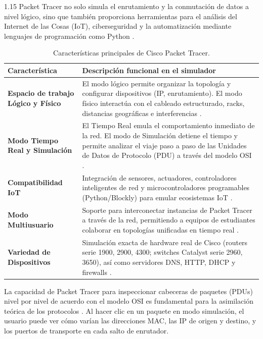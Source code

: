 \documentclass[11pt, a4paper]{article}
\begin{document}
\begin{spacing}{1.15}
Packet Tracer no solo simula el enrutamiento y la conmutación de datos a nivel lógico, sino que también proporciona herramientas para el análisis del Internet de las Cosas (IoT), ciberseguridad y la automatización mediante lenguajes de programación como Python \cite{pt_docs}.

\begin{table}[H]
    \centering
    \renewcommand{\arraystretch}{1.35}
    \begin{tabular}{|p{3.5cm}|p{11cm}|}
        \hline
        \textbf{Característica} & \textbf{Descripción funcional en el simulador} \\ \hline
        \textbf{Espacio de trabajo Lógico y Físico} & El modo lógico permite organizar la topología y configurar dispositivos (IP, enrutamiento). El modo físico interactúa con el cableado estructurado, racks, distancias geográficas e interferencias \cite{skillsforall}. \\ \hline
        \textbf{Modo Tiempo Real y Simulación} & El Tiempo Real emula el comportamiento inmediato de la red. El modo de Simulación detiene el tiempo y permite analizar el viaje paso a paso de las Unidades de Datos de Protocolo (PDU) a través del modelo OSI \cite{pt_docs}. \\ \hline
        \textbf{Compatibilidad IoT} & Integración de sensores, actuadores, controladores inteligentes de red y microcontroladores programables (Python/Blockly) para emular ecosistemas IoT \cite{skillsforall}. \\ \hline
        \textbf{Modo Multiusuario} & Soporte para interconectar instancias de Packet Tracer a través de la red, permitiendo a equipos de estudiantes colaborar en topologías unificadas en tiempo real \cite{pt_docs}. \\ \hline
        \textbf{Variedad de Dispositivos} & Simulación exacta de hardware real de Cisco (routers serie 1900, 2900, 4300; switches Catalyst serie 2960, 3650), así como servidores DNS, HTTP, DHCP y firewalls \cite{pt_docs}. \\ \hline
    \end{tabular}
    \caption{Características principales de Cisco Packet Tracer.}
\end{table}

La capacidad de Packet Tracer para inspeccionar cabeceras de paquetes (PDUs) nivel por nivel de acuerdo con el modelo OSI es fundamental para la asimilación teórica de los protocolos \cite{pt_docs}. Al hacer clic en un paquete en modo simulación, el usuario puede ver cómo varían las direcciones MAC, las IP de origen y destino, y los puertos de transporte en cada salto de enrutador.


\end{spacing}
\end{document}

